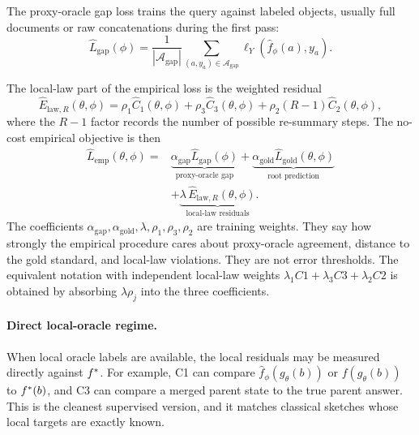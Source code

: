 The proxy-oracle gap loss trains the query against labeled objects,
usually full documents or raw concatenations during the first pass:
\[
  \widehat L_{\mathrm{gap}}(\phi)
  =
  \frac{1}{|\mathcal A_{\mathrm{gap}}|}
  \sum_{(a,y_a)\in\mathcal A_{\mathrm{gap}}}
  \ell_Y\!\left(
    \widehat f_\phi(a),
    y_a
  \right).
\]

The local-law part of the empirical loss is the weighted residual
\[
  \widehat E_{\mathrm{law},R}(\theta,\phi)
  =
  \rho_1\widehat C_1(\theta,\phi)
  +\rho_3\widehat C_3(\theta,\phi)
  +\rho_2(R-1)\widehat C_2(\theta,\phi),
\]
where the \(R-1\) factor records the number of possible re-summary
steps. The no-cost empirical objective is then
\begin{equation}
\label{eq:v7-learned-objective}
  \begin{aligned}
  \widehat L_{\mathrm{emp}}(\theta,\phi)
  =
  &\underbrace{\alpha_{\mathrm{gap}}\widehat L_{\mathrm{gap}}(\phi)}
    _{\text{proxy-oracle gap}}
  +\underbrace{\alpha_{\mathrm{gold}}\widehat L_{\mathrm{gold}}(\theta,\phi)}
    _{\text{root prediction}} \\
  &+\underbrace{\lambda\,\widehat E_{\mathrm{law},R}(\theta,\phi)}
    _{\text{local-law residuals}} .
  \end{aligned}
\end{equation}
The coefficients
\(\alpha_{\mathrm{gap}},\alpha_{\mathrm{gold}},\lambda,\rho_1,\rho_3,\rho_2\)
are training weights. They say how strongly the empirical procedure
cares about proxy-oracle agreement, distance to the gold standard, and
local-law violations. They are not error thresholds. The equivalent
notation with independent local-law weights
\(\lambda_1 C1+\lambda_3 C3+\lambda_2 C2\) is obtained by absorbing
\(\lambda\rho_j\) into the three coefficients.

\paragraph{Direct local-oracle regime.}
When local oracle labels are available, the local residuals may be
measured directly against \(f^\ast\). For example, C1 can compare
\(\widehat f_\phi(g_\theta(b))\) or \(f(g_\theta(b))\) to
\(f^\ast(b)\), and C3 can compare a merged parent state to the true
parent answer. This is the cleanest supervised version, and it matches
classical sketches whose local targets are exactly known.

